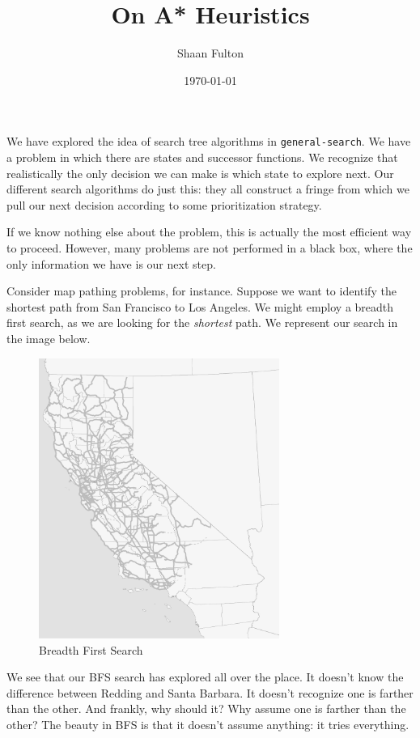 \documentclass[12pt]{article}
\title{On A* Heuristics}
\author{Shaan Fulton}
\date{\today}
\begin{document}
\maketitle

We have explored the idea of search tree algorithms in \texttt{general-search}. We have a problem in which there are states and successor functions. We recognize that realistically the only decision we can make is which state to explore next. Our different search algorithms do just this: they all construct a fringe from which we pull our next decision according to some prioritization strategy.

If we know nothing else about the problem, this is actually the most efficient way to proceed. However, many problems are not performed in a black box, where the only information we have is our next step.

Consider map pathing problems, for instance. Suppose we want to identify the shortest path from San Francisco to Los Angeles. We might employ a breadth first search, as we are looking for the \textit{shortest} path. We represent our search in the image below.

\begin{figure}[h]
    \centering
    \includegraphics[width=0.7\textwidth]{BFS.png}
    \caption{Breadth First Search}
    \label{fig:bfs}
\end{figure}

\newpage

We see that our BFS search has explored all over the place. It doesn't know the difference between Redding and Santa Barbara. It doesn't recognize one is farther than the other. And frankly, why should it? Why assume one is farther than the other? The beauty in BFS is that it doesn't assume anything: it tries everything.
\end{document}
